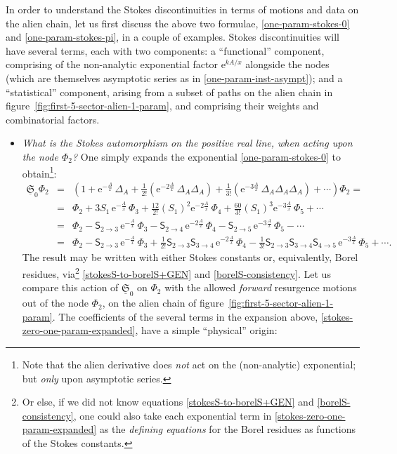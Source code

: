 \documentclass[11pt,a4paper]{article}
\newcommand{\rme}{{\mathrm{e}}}
\begin{document}
In order to understand the Stokes discontinuities in terms of motions and data on the alien chain, let us first discuss the above two formulae, \eqref{one-param-stokes-0} and \eqref{one-param-stokes-pi}, in a couple of examples. Stokes discontinuities will have several terms, each with two components: a ``functional'' component, comprising of the non-analytic exponential factor $\rme^{kA/x}$ alongside the nodes (which are themselves asymptotic series as in \eqref{one-param-inst-asympt}); and a ``statistical'' component, arising from a subset of paths on the alien chain in figure~\ref{fig:first-5-sector-alien-1-param}, and comprising their weights and combinatorial factors.
%
\begin{itemize}
%
\item \textit{What is the Stokes automorphism on the positive real line, when acting upon the node $\Phi_2$?} One simply expands the exponential \eqref{one-param-stokes-0} to obtain\footnote{Note that the alien derivative does \textit{not} act on the (non-analytic) exponential; but \textit{only} upon asymptotic series.}:
%
\begin{eqnarray}
\underline{\mathfrak{S}}_0 \Phi_2 &=& \left( 1 + \rme^{-\frac{A}{x}}\, \Delta_{A} + \frac{1}{2!} \left( \rme^{-2\frac{A}{x}}\, \Delta_{A} \Delta_{A} \right) + \frac{1}{3!} \left( \rme^{-3\frac{A}{x}}\, \Delta_{A} \Delta_{A} \Delta_{A} \right) + \cdots \right)\Phi_2 = \nonumber \\
&=&
\Phi_2 + 3 S_1\, \rme^{-\frac{A}{x}}\, \Phi_3 + \frac{12}{2!} \left( S_1 \right)^2 \rme^{-2\frac{A}{x}}\, \Phi_4 + \frac{60}{3!} \left( S_1 \right)^3 \rme^{-3\frac{A}{x}}\, \Phi_5 + \cdots \nonumber \\
\label{stokes-zero-one-param-expanded}
&=&
\Phi_2 - \mathsf{S}_{2\to3}\, \rme^{-\frac{A}{x}}\, \Phi_3 - \mathsf{S}_{2\to4}\, \rme^{-2\frac{A}{x}}\, \Phi_4 - \mathsf{S}_{2\to5}\, \rme^{-3\frac{A}{x}}\, \Phi_5 - \cdots \\
&=&
\Phi_2 - \mathsf{S}_{2\to3}\, \rme^{-\frac{A}{x}}\, \Phi_3 + \frac{1}{2!} \mathsf{S}_{2\to3} \mathsf{S}_{3\to4}\, \rme^{-2\frac{A}{x}}\, \Phi_4 - \frac{1}{3!} \mathsf{S}_{2\to3} \mathsf{S}_{3\to4} \mathsf{S}_{4\to5}\, \rme^{-3\frac{A}{x}}\, \Phi_5 + \cdots. \nonumber
\end{eqnarray}
%
\noindent
The result may be written with either Stokes constants or, equivalently, Borel residues, via\footnote{Or else, if we did not know equations \eqref{stokesS-to-borelS+GEN} and \eqref{borelS-consistency}, one could also take each exponential term in \eqref{stokes-zero-one-param-expanded} as the \textit{defining equations} for the Borel residues as functions of the Stokes constants.} \eqref{stokesS-to-borelS+GEN} and \eqref{borelS-consistency}. Let us compare this action of $\underline{\mathfrak{S}}_0$ on $\Phi_2$ with the allowed \textit{forward} resurgence motions out of the node $\Phi_2$, on the alien chain of figure~\ref{fig:first-5-sector-alien-1-param}. The coefficients of the several terms in the expansion above, \eqref{stokes-zero-one-param-expanded}, have a simple ``physical'' origin:

\end{itemize}
\end{document}
